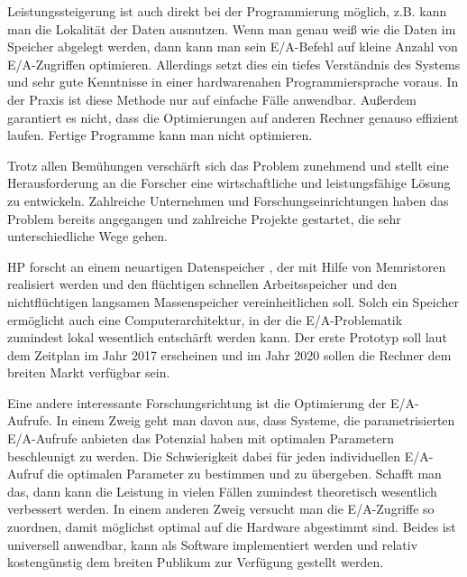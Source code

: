 
Leistungssteigerung ist auch direkt bei der Programmierung möglich, z.B. kann man die Lokalität der Daten ausnutzen. Wenn man genau weiß wie die Daten im Speicher abgelegt werden, dann kann man sein E/A-Befehl auf kleine Anzahl von E/A-Zugriffen optimieren. Allerdings setzt dies ein tiefes Verständnis des Systems und sehr gute Kenntnisse in einer hardwarenahen Programmiersprache voraus. In der Praxis ist diese Methode nur auf einfache Fälle anwendbar. Außerdem garantiert es nicht, dass die Optimierungen auf anderen Rechner genauso effizient laufen. Fertige Programme kann man nicht optimieren.

Trotz allen Bemühungen verschärft sich das Problem zunehmend und stellt eine Herausforderung an die Forscher eine wirtschaftliche und leistungsfähige Lösung zu entwickeln. Zahlreiche Unternehmen und Forschungseinrichtungen haben das Problem bereits angegangen und zahlreiche Projekte gestartet, die sehr unterschiedliche Wege gehen.

HP forscht an einem neuartigen Datenspeicher \cite{hp_memristor_future}, der mit Hilfe von Memristoren realisiert werden und den flüchtigen schnellen Arbeitsspeicher und den nichtflüchtigen langsamen Massenspeicher vereinheitlichen soll. Solch ein Speicher ermöglicht auch eine Computerarchitektur, in der die E/A-Problematik zumindest lokal wesentlich entschärft werden kann. Der erste Prototyp soll laut dem Zeitplan im Jahr 2017 erscheinen und im Jahr 2020 sollen die Rechner dem breiten Markt verfügbar sein. 

Eine andere interessante Forschungsrichtung ist die Optimierung der E/A-Aufrufe. In einem Zweig geht man davon aus, dass Systeme, die parametrisierten E/A-Aufrufe anbieten das Potenzial haben mit optimalen Parametern beschleunigt zu werden. Die Schwierigkeit dabei für jeden individuellen E/A-Aufruf die optimalen Parameter zu bestimmen und zu übergeben. Schafft man das, dann kann die Leistung in vielen Fällen zumindest theoretisch wesentlich verbessert werden. In einem anderen Zweig versucht man die E/A-Zugriffe so zuordnen, damit möglichst optimal auf die Hardware abgestimmt sind. Beides ist universell anwendbar, kann als Software implementiert werden und relativ kostengünstig dem breiten Publikum zur Verfügung gestellt werden.

